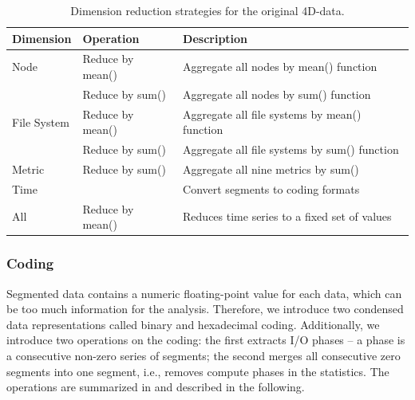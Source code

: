 \documentclass{jhps}
\begin{document}
\begin{table}
	\centering
	\begin{tabularx}{\textwidth}{llX}
		Dimension       & Operation                                    &  Description                                   \\
		\midrule
		Node            & Reduce by mean()                             &  Aggregate all nodes by mean() function        \\
		                & Reduce by sum()                              &  Aggregate all nodes by sum() function         \\
		File System     & Reduce by mean()                             &  Aggregate all file systems by mean() function \\
		                &
		Reduce by sum() & Aggregate all file systems by sum() function \\
		Metric          & Reduce by sum()                              &  Aggregate all nine metrics by sum()           \\
		Time            &                                              &  Convert segments to coding formats            \\
		All             & Reduce by mean()                             &  Reduces time series to a fixed set of values  \\
	\end{tabularx}
	\caption{Dimension reduction strategies for the original 4D-data.}
	\label{tab:reduction_techniques}
\end{table}

\subsubsection{Coding}


Segmented data contains a numeric floating-point value for each data, which can be too much information for the analysis.
Therefore, we introduce two condensed data representations called binary and hexadecimal coding.
Additionally, we introduce two operations on the coding:
the first extracts I/O phases -- a phase is a consecutive non-zero series of segments;
the second merges all consecutive zero segments into one segment, i.e., removes compute phases in the statistics.
The operations are summarized in  and described in the following.
\end{document}

